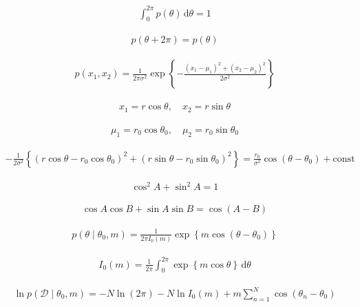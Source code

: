 \documentclass{article}
\begin{document}
\begin{align*}
\int_{0}^{2 \pi} p(\theta) \, \mathrm{d} \theta = 1 
\tag{3.121}
\end{align*}

\begin{align*}
p(\theta + 2\pi) = p(\theta) 
\tag{3.122}
\end{align*}

\begin{align*}
p(x_1, x_2) = \frac{1}{2\pi \sigma^2} \exp \left\{ -\frac{(x_1 - \mu_1)^2 + (x_2 - \mu_2)^2}{2\sigma^2} \right\}
\tag{3.123}
\end{align*}

\begin{align*}
x_1 = r \cos \theta, \quad x_2 = r \sin \theta
\tag{3.124}
\end{align*}

\begin{align*}
\mu_1 = r_0 \cos \theta_0, \quad \mu_2 = r_0 \sin \theta_0 
\tag{3.125}
\end{align*}

\begin{align*}
-\frac{1}{2\sigma^2} \left\{ \left( r \cos \theta - r_0 \cos \theta_0 \right)^2 + \left( r \sin \theta - r_0 \sin \theta_0 \right)^2 \right\}
= \frac{r_0}{\sigma^2} \cos(\theta - \theta_0) + \text{const}
\tag{3.126}
\end{align*}

\begin{align*}
\cos^2 A + \sin^2 A = 1
\tag{3.127}
\end{align*}

\begin{align*}
\cos A \cos B + \sin A \sin B = \cos(A - B) 
\tag{3.128}
\end{align*}

\begin{align*}
p(\theta \mid \theta_0, m) = \frac{1}{2\pi I_0(m)} \exp \left\{ m \cos(\theta - \theta_0) \right\} 
\tag{3.129}
\end{align*}

\begin{align*}
I_0(m) = \frac{1}{2\pi} \int_0^{2\pi} \exp \left\{ m \cos \theta \right\} \, \mathrm{d} \theta 
\tag{3.130}
\end{align*}

\begin{align*}
\ln p(\mathcal{D} \mid \theta_0, m) = -N \ln (2\pi) - N \ln I_0(m) + m \sum_{n=1}^{N} \cos(\theta_n - \theta_0) 
\tag{3.131}
\end{align*}
\end{document}
